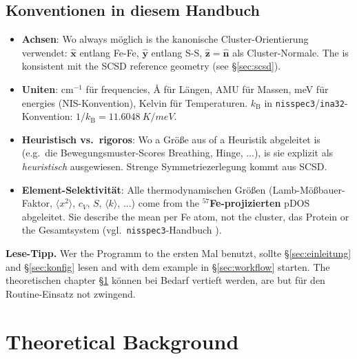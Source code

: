 \documentclass[11pt,a4paper,twoside]{article}
\newcommand{\nhat}{\hat{\mathbf{n}}}
\newcommand{\xhat}{\hat{\mathbf{x}}}
\newcommand{\yhat}{\hat{\mathbf{y}}}
\newcommand{\zhat}{\hat{\mathbf{z}}}
\newcommand{\kB}{k_{\mathrm{B}}}
\theoremstyle{remark}
\begin{document}
\subsection{Konventionen in diesem Handbuch}

\begin{itemize}
  \item \textbf{Achsen}: Wo always m\"oglich is the kanonische
        Cluster-Orientierung verwendet:
        $\xhat$ entlang Fe-Fe, $\yhat$ entlang S-S,
        $\zhat = \nhat$ als Cluster-Normale. The is konsistent mit
        the SCSD reference geometry (see \S\ref{sec:scsd}).
  \item \textbf{Uniten}: cm$^{-1}$ f\"ur frequencies,
        \AA{} f\"ur L\"angen, AMU f\"ur Massen, meV f\"ur energies
        (NIS-Konvention), Kelvin f\"ur Temperaturen.
        $\kB$ in \texttt{nisspec3}/\texttt{ina32}-Konvention:
        $1/\kB = \SI{11.6048}{K/meV}$.
  \item \textbf{Heuristisch vs.\ rigoros}: Wo a Gr\"o\ss e aus
        of a Heuristik abgeleitet is (e.g.\ die
        Bewegungsmuster-Scores Breathing, Hinge, ...), is sie
        explizit als \emph{heuristisch} ausgewiesen. Strenge
        Symmetriezerlegung kommt aus SCSD.
  \item \textbf{Element-Selektivit\"at}: Alle thermodynamischen
        Gr\"o\ss en (Lamb-M\"o\ss bauer-Faktor, $\langle x^2 \rangle$,
        $c_V$, $S$, $\langle k\rangle$, ...) come from the
        \textbf{$^{57}$Fe-projizierten} pDOS abgeleitet. Sie
        describe the mean per Fe atom, not the cluster, das
        Protein or the Gesamtsystem (vgl.\ \texttt{nisspec3}-Handbuch \cite{NisspecHandbuch}).
\end{itemize}

\begin{infobox}
\textbf{Lese-Tipp.} Wer the Programm to the ersten Mal benutzt, sollte
\S\ref{sec:einleitung} and \S\ref{sec:konfig} lesen and with dem
example in \S\ref{sec:workflow} starten. The theoretischen chapter
\S\ref{sec:theorie} k\"onnen bei Bedarf vertieft werden, are but f\"ur
den Routine-Einsatz not zwingend.
\end{infobox}

\section{Theoretical Background}
\label{sec:theorie}

\end{document}
